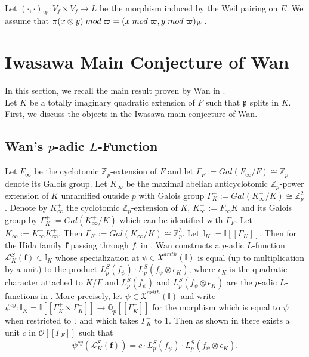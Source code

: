 \documentclass[reqno,10pt]{amsart}
\newcommand{\zp}{\mathbb{Z}_{p}}
\newcommand{\qp}{\mathbb{Q}_{p}}
\newcommand{\I}{\mathbb{I}}
\newcommand{\f}{\mathbf{f}}
\newcommand{\mcO}{\mathcal{O}}
\newcommand{\p}{\mathfrak{p}}
\theoremstyle{plain}
\theoremstyle{definition}
\begin{document}
\\
Let $(\cdot,\cdot)_W : V_f \times V_f \rightarrow L$ be the morphism induced by the Weil pairing on $E$.  We assume that $\pi(x \otimes y) \hspace{1mm} mod \hspace{1mm} \varpi = (x \hspace{1mm} mod \hspace{1mm} \varpi, y \hspace{1mm} mod \hspace{1mm} \varpi)_W$.





\section{Iwasawa Main Conjecture of Wan} \label{Wan}
In this section, we recall the main result proven by Wan in \cite[Theorem 3]{Wan}.
\\
Let $K$ be a totally imaginary quadratic extension of $F$ such that $\p$ splits in $K$. First, we discuss the objects in the Iwasawa main conjecture of Wan.

\subsection{Wan's $p$-adic $L$-Function} \label{K_infty}
Let $F_\infty$ be the cyclotomic $\zp$-extension of $F$ and let $\Gamma_F := Gal(F_\infty/F) \cong \zp$ denote its Galois group.  Let $K_\infty^-$ be the maximal abelian anticyclotomic $\zp$-power extension of $K$ unramified outside $p$ with Galois group $\Gamma_K^- := Gal(K_\infty^-/K) \cong \zp^2$. Denote by $K_\infty^+$ the cyclotomic $\zp$-extension of $K$, $K_\infty^+ := F_\infty K$ and its Galois group by $\Gamma_K^+ := Gal(K_\infty^+/K)$ which can be identified with $\Gamma_F$. Let $K_\infty := K_\infty^- K_\infty^+$. Then $\Gamma_K := Gal(K_\infty/K) \cong \zp^3$. Let $\I_K := \I[[\Gamma_K]]$.  Then for the Hida family $\f$ passing through $f$, in \cite[Section 7.3]{Wan}, Wan constructs a $p$-adic $L$-function $\mathcal{L}^S_K(\f) \in \I_K$ whose specialization at $\psi \in \mathfrak{X}^{arith}(\I)$ is equal (up to multiplication by a unit) to the product $L_p^S(f_\psi) \cdot L_p^S(f_\psi \otimes \epsilon_K)$, where $\epsilon_K$ is the quadratic character attached to $K/F$ and $L_p^S(f_\psi)$ and $L_p^S(f_\psi \otimes \epsilon_K)$ are the $p$-adic $L$-functions in \cite{loeffler2020iwasawatheoryquadratichilbert}. More precisely, let $\psi \in \mathfrak{X}^{arith}(\I)$ and write $\psi^{cy} : \I_K = \I[[\Gamma_K^+ \times \Gamma_K^-]] \rightarrow \overline{\qp}[[\Gamma_K^+]]$ for the morphism which is equal to $\psi$ when restricted to $\I$ and which takes $\Gamma_K^-$ to 1. Then as shown in \cite[Proposition 13.3.2]{loeffler2020iwasawatheoryquadratichilbert} there exists a unit $c$ in $\mcO[[\Gamma_F]]$ such that
\begin{align} \label{FactorisationInLZ}
   \psi^{cy}(\mathcal{L}^S_K(\f)) = c \cdot L_p^S(f_\psi) \cdot L_p^S(f_\psi \otimes \epsilon_K).
\end{align}
\end{document}
